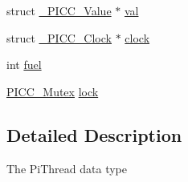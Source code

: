 \begin{DoxyCompactItemize}
\item 
struct \hyperlink{struct__PICC__Value}{\-\_\-\-P\-I\-C\-C\-\_\-\-Value} $\ast$ \hyperlink{struct__PICC__PiThread_a4ea626adcda4fe73b9b2fdf12b824c83}{val}
\item 
struct \hyperlink{struct__PICC__Clock}{\-\_\-\-P\-I\-C\-C\-\_\-\-Clock} $\ast$ \hyperlink{struct__PICC__PiThread_a82e0d888275cbcc0e0995456f0b49e4e}{clock}
\item 
int \hyperlink{struct__PICC__PiThread_ade9af8e74e38619a991f6881a0ff2e1e}{fuel}
\item 
\hyperlink{sync_8h_a600a20a1dd394c06182a81d72e3357f4}{P\-I\-C\-C\-\_\-\-Mutex} \hyperlink{struct__PICC__PiThread_a83441acd517b78752c3766872623b1e6}{lock}
\end{DoxyCompactItemize}



\subsection{Detailed Description}
The Pi\-Thread data type 

